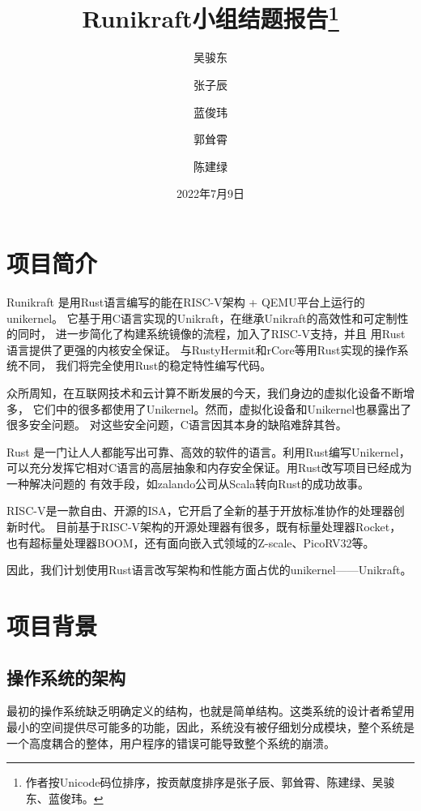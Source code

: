 \documentclass{../runikraft-report}
\renewcommand{\today}{2022年7月9日}
\begin{document}
\title{\bfseries Runikraft小组\quad 结题报告\thanks{作者按Unicode码位排序，按贡献度排序是张子辰、郭耸霄、陈建绿、吴骏东、蓝俊玮。}}
\author{吴骏东\and 张子辰\and 蓝俊玮\and 郭耸霄\and 陈建绿}
\date{\today}
\maketitle

\tableofcontents

\section{项目简介}
Runikraft 是用Rust语言编写的能在RISC-V架构 + QEMU平台上运行的unikernel。
它基于用C语言实现的Unikraft，在继承Unikraft的高效性和可定制性的同时，
进一步简化了构建系统镜像的流程，加入了RISC-V支持，并且
用Rust语言提供了更强的内核安全保证。
与RustyHermit和rCore等用Rust实现的操作系统不同，
我们将完全使用Rust的稳定特性编写代码。

众所周知，在互联网技术和云计算不断发展的今天，我们身边的虚拟化设备不断增多，
它们中的很多都使用了Unikernel。然而，虚拟化设备和Unikernel也暴露出了很多安全问题。
对这些安全问题，C语言因其本身的缺陷难辞其咎。

Rust 是一门让人人都能写出可靠、高效的软件的语言。\cite{bib:feasibility-7}利用Rust编写Unikernel，
可以充分发挥它相对C语言的高层抽象和内存安全保证。用Rust改写项目已经成为一种解决问题的
有效手段，如zalando公司从Scala转向Rust的成功故事。\cite{bib:feasibility-3}

RISC-V是一款自由、开源的ISA，它开启了全新的基于开放标准协作的处理器创新时代。\cite{bib:feasibility-0}
目前基于RISC-V架构的开源处理器有很多，既有标量处理器Rocket，
也有超标量处理器BOOM，还有面向嵌入式领域的Z-scale、PicoRV32等。\cite{bib:feasibility-2}

因此，我们计划使用Rust语言改写架构和性能方面占优的unikernel——Unikraft。

\section{项目背景}
\subsection{操作系统的架构}
最初的操作系统缺乏明确定义的结构，也就是简单结构。这类系统的设计者希望用
最小的空间提供尽可能多的功能，因此，系统没有被仔细划分成模块，整个系统是
一个高度耦合的整体，用户程序的错误可能导致整个系统的崩溃。\cite{bib:os-concept}
\end{document}
